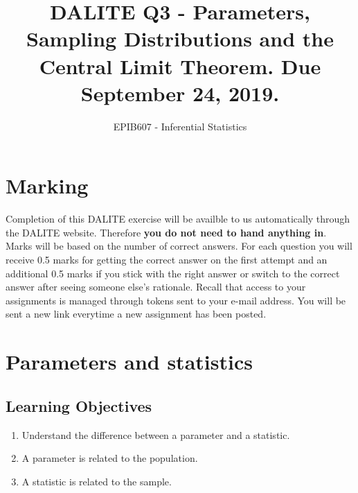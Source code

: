 \documentclass[letterpaper,9pt,twocolumn,twoside,printwatermark=false]{pinp}
\title{DALITE Q3 - Parameters, Sampling Distributions and the Central Limit
Theorem. Due September 24, 2019.}
\author[a]{EPIB607 - Inferential Statistics}
\affil[a]{Fall 2019, McGill University}
\providecommand{\tightlist}{%
  \setlength{\itemsep}{0pt}\setlength{\parskip}{0pt}}
\begin{document}
\verticaladjustment{-2pt}

\maketitle
\thispagestyle{firststyle}



\hypertarget{marking}{%
\section*{Marking}\label{marking}}

Completion of this DALITE exercise will be availble to us automatically
through the DALITE website. Therefore \textbf{you do not need to hand
anything in}. Marks will be based on the number of correct answers. For
each question you will receive 0.5 marks for getting the correct answer
on the first attempt and an additional 0.5 marks if you stick with the
right answer or switch to the correct answer after seeing someone else's
rationale. Recall that access to your assignments is managed through
tokens sent to your e-mail address. You will be sent a new link
everytime a new assignment has been posted.

\hypertarget{parameters-and-statistics}{%
\section{Parameters and statistics}\label{parameters-and-statistics}}

\hypertarget{learning-objectives}{%
\subsection{Learning Objectives}\label{learning-objectives}}

\begin{enumerate}
\def\labelenumi{\arabic{enumi}.}
\tightlist
\item
  Understand the difference between a parameter and a statistic.
\item
  A parameter is related to the population.
\item
  A statistic is related to the sample.
\end{enumerate}
\end{document}
